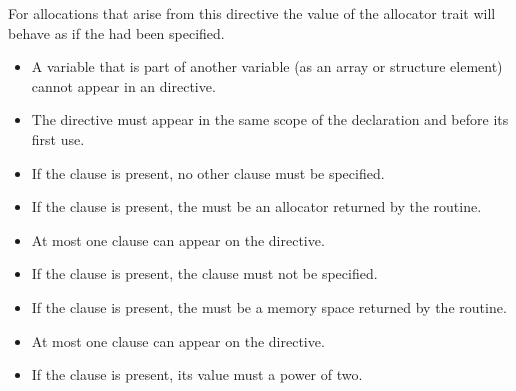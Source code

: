 For allocations that arise from this directive the  value of the  allocator trait will behave as if the  had been specified.

\restrictions
\begin{itemize}
\item A variable that is part of another variable (as an array or structure element) cannot appear in an  directive.
\item The directive must appear in the same scope of the  declaration and before its first use.
\item If the  clause is present, no other clause must be specified.
\item If the  clause is present, the  must be an allocator returned by the  routine.
\item At most one  clause can appear on the  directive.
\item If the  clause is present, the   clause must not be specified.
\item If the  clause is present, the  must be a memory space returned by the  routine.
\item At most one  clause can appear on the  directive.
\item If the  clause is present, its value must a power of two.
\end{itemize}

